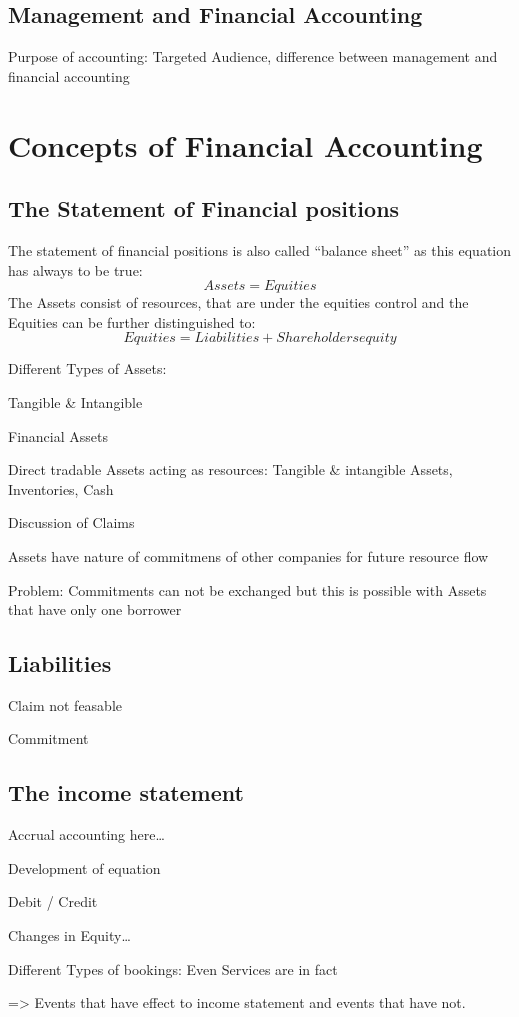 \subsection{Management and Financial Accounting}
Purpose of accounting: Targeted Audience, difference between management and
financial accounting
\section{Concepts of Financial Accounting}
\subsection{The Statement of Financial positions}
The statement of financial positions is also called \enquote{balance sheet} as this equation has always to be true:
\[ Assets = Equities \]
The Assets consist of resources, that are under the equities control and the Equities can be further distinguished to:
\[ Equities = Liabilities + Shareholders equity\]


Different Types of Assets:

Tangible \& Intangible

Financial Assets

Direct tradable Assets acting as resources: Tangible \& intangible Assets,
Inventories, Cash

Discussion of Claims

Assets have nature of commitmens of other companies for future resource flow

Problem: Commitments can not be exchanged but this is possible with Assets that have only one borrower

\subsection{Liabilities}
Claim not feasable

Commitment

\subsection{The income statement}
Accrual accounting here\ldots

Development of equation

Debit / Credit

Changes in Equity\ldots

Different Types of bookings:
Even Services are in fact

=> Events that have effect to income statement and events that have not.

